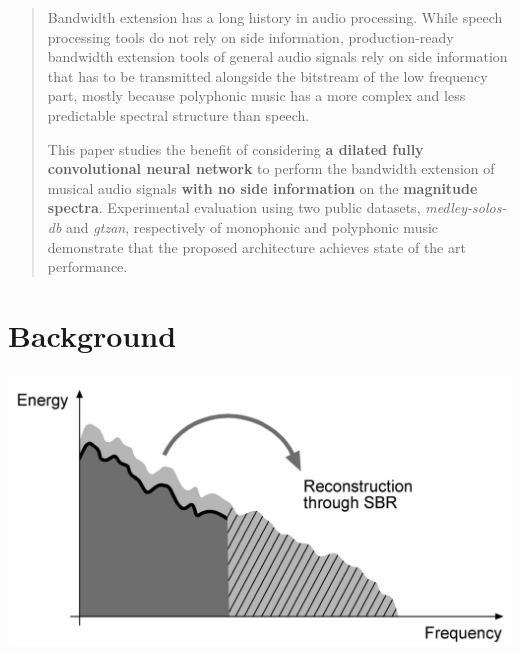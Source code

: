 \documentclass[a0,portrait,20pt]{a0poster}
\begin{document}

\begin{multicols}{2} %


\color{Navy} %

\begin{abstract}

Bandwidth extension has a long history in audio processing. While speech processing tools do not rely on side information, production-ready bandwidth extension tools of general audio signals rely on side information that has to be transmitted alongside the bitstream of the low frequency part, mostly because polyphonic music has a more complex and less predictable spectral structure than speech.

This paper studies the benefit of considering \textbf{a dilated fully convolutional neural network} to perform the bandwidth extension of musical audio signals \textbf{with no side information} on the \textbf{magnitude spectra}. Experimental evaluation using two public datasets, \textit{medley-solos-db} and \textit{gtzan}, respectively of monophonic and polyphonic music demonstrate that the proposed architecture achieves state of the art performance.

\end{abstract}


\color{SaddleBrown} %

\section*{Background}

\begin{center}\vspace{1cm}
\includegraphics[width=.6\linewidth]{sbr}
\end{center}\vspace{1cm}


\end{multicols}
\end{document}
